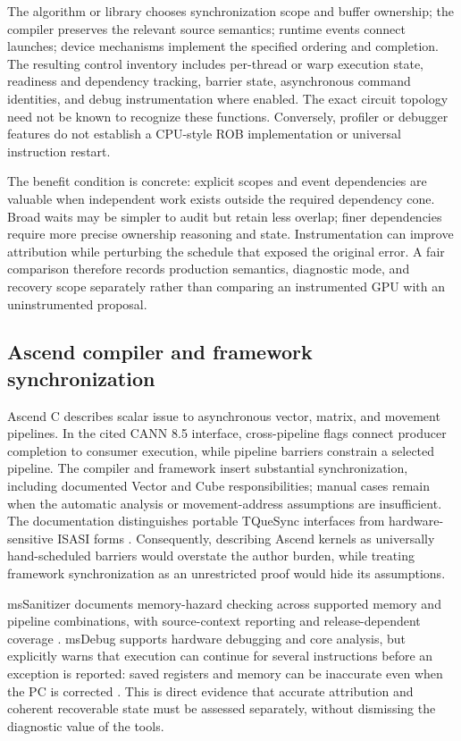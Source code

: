 The algorithm or library chooses synchronization scope and buffer ownership; the compiler preserves the relevant source semantics; runtime events connect launches; device mechanisms implement the specified ordering and completion. The resulting control inventory includes per-thread or warp execution state, readiness and dependency tracking, barrier state, asynchronous command identities, and debug instrumentation where enabled. The exact circuit topology need not be known to recognize these functions. Conversely, profiler or debugger features do not establish a CPU-style ROB implementation or universal instruction restart.

The benefit condition is concrete: explicit scopes and event dependencies are valuable when independent work exists outside the required dependency cone. Broad waits may be simpler to audit but retain less overlap; finer dependencies require more precise ownership reasoning and state. Instrumentation can improve attribution while perturbing the schedule that exposed the original error. A fair comparison therefore records production semantics, diagnostic mode, and recovery scope separately rather than comparing an instrumented GPU with an uninstrumented proposal.

\subsection{Ascend compiler and framework synchronization}

Ascend C describes scalar issue to asynchronous vector, matrix, and movement pipelines. In the cited CANN 8.5 interface, cross-pipeline flags connect producer completion to consumer execution, while pipeline barriers constrain a selected pipeline. The compiler and framework insert substantial synchronization, including documented Vector and Cube responsibilities; manual cases remain when the automatic analysis or movement-address assumptions are insufficient. The documentation distinguishes portable TQueSync interfaces from hardware-sensitive ISASI forms \citep{u007_ascend_sync}. Consequently, describing Ascend kernels as universally hand-scheduled barriers would overstate the author burden, while treating framework synchronization as an unrestricted proof would hide its assumptions.

msSanitizer documents memory-hazard checking across supported memory and pipeline combinations, with source-context reporting and release-dependent coverage \citep{u007_ascend_sanitizer}. msDebug supports hardware debugging and core analysis, but explicitly warns that execution can continue for several instructions before an exception is reported: saved registers and memory can be inaccurate even when the PC is corrected \citep{u007_ascend_debug}. This is direct evidence that accurate attribution and coherent recoverable state must be assessed separately, without dismissing the diagnostic value of the tools.

